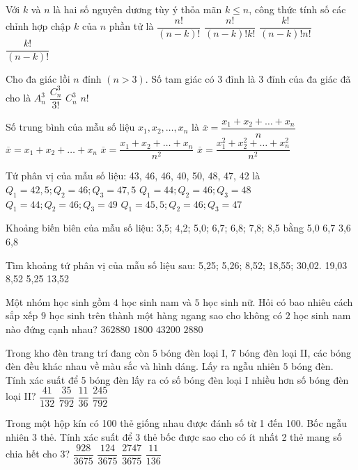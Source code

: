 \begin{ex}
Với $k$ và $n$ là hai số nguyên dương tùy ý thỏa mãn $k\le n$, công thức tính số các chỉnh hợp chập $k$ của $n$ phần tử là
\choice
{$\dfrac{n!}{(n-k)!}$}
{$\dfrac{n!}{(n-k)!k!}$}
{$\dfrac{k!}{(n-k)!n!}$}
{$\dfrac{k!}{(n-k)!}$}
\end{ex}
\begin{ex}
Cho đa giác lồi $n$ đỉnh $\left(n>3\right)$. Số tam giác có $3$ đỉnh là $3$ đỉnh của đa giác đã cho là
\choice
{$A_n^3$}
{$\dfrac{C_n^3}{3!}$}
{$C_n^3$}
{$n!$}
\end{ex}
\begin{ex}
Số trung bình của mẫu số liệu $x_1,x_2,\ldots,x_n$ là
\choice
{$\overline{x}=\dfrac{x_1+x_2+\ldots+x_n}{n}$}
{$\overline{x}=x_1+x_2+\ldots+x_n$}
{$\overline{x}=\dfrac{x_1+x_2+\ldots+x_n}{n^2}$}
{$\overline{x}=\dfrac{x_1^2+x_2^2+\ldots+x_n^2}{n^2}$}
\end{ex}
\begin{ex}
Tứ phân vị của mẫu số liệu: 43, 46, 46, 40, 50, 48, 47, 42 là
\choice
{$Q_1=42{,}5;Q_2=46;Q_3=47{,}5$}
{$Q_1=44;Q_2=46;Q_3=48$}
{$Q_1=44;Q_2=46;Q_3=49$}
{$Q_1=45{,}5;Q_2=46;Q_3=47$}
\end{ex}
\begin{ex}
Khoảng biến biên của mẫu số liệu: 3{,}5; 4{,}2; 5{,}0; 6{,}7; 6{,}8; 7{,}8; 8{,}5 bằng
\choice
{5{,}0}
{6{,}7}
{3{,}6}
{6{,}8}
\end{ex}
\begin{ex}
Tìm khoảng tứ phân vị của mẫu số liệu sau: 5{,}25; 5{,}26; 8{,}52; 18{,}55; 30{,}02.
\choice
{19{,}03}
{8{,}52}
{5{,}25}
{13{,}52}
\end{ex}
\begin{ex}
Một nhóm học sinh gồm $4$ học sinh nam và $5$ học sinh nữ. Hỏi có bao nhiêu cách sắp xếp $9$ học sinh trên thành một hàng ngang sao cho không có $2$ học sinh nam nào đứng cạnh nhau?
\choice
{$362880$}
{$1800$}
{$43200$}
{$2880$}
\end{ex}
\begin{ex}
Trong kho đèn trang trí đang còn $5$ bóng đèn loại I, $7$ bóng đèn loại II, các bóng đèn đều khác nhau về màu sắc và hình dáng. Lấy ra ngẫu nhiên $5$ bóng đèn. Tính xác suất để 5 bóng đèn lấy ra có số bóng đèn loại I nhiều hơn số bóng đèn loại II?
\choice
{$\dfrac{41}{132}$}
{$\dfrac{35}{792}$}
{$\dfrac{11}{36}$}
{$\dfrac{245}{792}$}
\end{ex}
\begin{ex}
Trong một hộp kín có 100 thẻ giống nhau được đánh số từ 1 đến 100. Bốc ngẫu nhiên 3 thẻ. Tính xác suất để 3 thẻ bốc được sao cho có ít nhất 2 thẻ mang số chia hết cho 3?
\choice
{$\dfrac{928}{3675}$}
{$\dfrac{124}{3675}$}
{$\dfrac{2747}{3675}$}
{$\dfrac{11}{136}$}
\end{ex}

